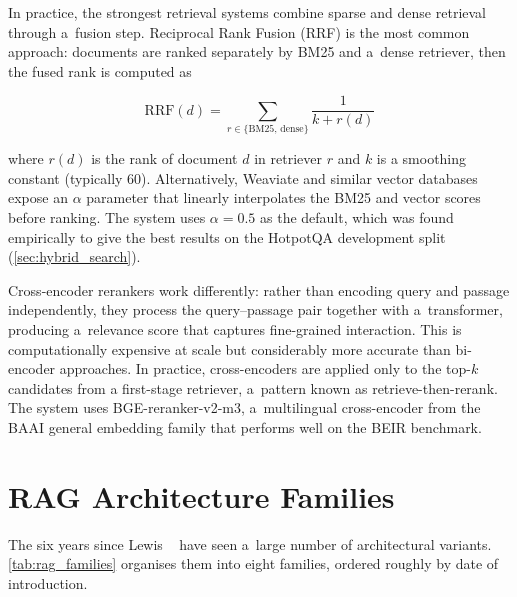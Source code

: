 In practice, the strongest retrieval systems combine sparse and dense retrieval
through a~fusion step.
Reciprocal Rank Fusion (RRF) is the most common approach: documents are ranked
separately by BM25 and a~dense retriever, then the fused rank is computed as

\begin{equation}
  \text{RRF}(d) = \sum_{r \in \{\text{BM25},\, \text{dense}\}} \frac{1}{k + r(d)}
  \label{eq:rrf}
\end{equation}

\noindent where $r(d)$ is the rank of document $d$ in retriever $r$ and $k$ is a
smoothing constant (typically 60).
Alternatively, Weaviate and similar vector databases expose an $\alpha$ parameter
that linearly interpolates the BM25 and vector scores before ranking.
The \medrag{} system uses $\alpha = 0.5$ as the default, which was found empirically
to give the best results on the HotpotQA development split (\cref{sec:hybrid_search}).

Cross-encoder rerankers work differently: rather than encoding query and passage
independently, they process the query--passage pair together with a~transformer,
producing a~relevance score that captures fine-grained interaction.
This is computationally expensive at scale but considerably more accurate than
bi-encoder approaches.
In practice, cross-encoders are applied only to the top-$k$ candidates from a
first-stage retriever, a~pattern known as retrieve-then-rerank.
The \medrag{} system uses BGE-reranker-v2-m3, a~multilingual cross-encoder
from the BAAI general embedding family that performs well on the BEIR benchmark.

\section{RAG Architecture Families}
\label{sec:rag_families}

The six years since Lewis \etal~\cite{lewis2020rag} have seen a~large number of
architectural variants.
\cref{tab:rag_families} organises them into eight families, ordered roughly by
date of introduction.

